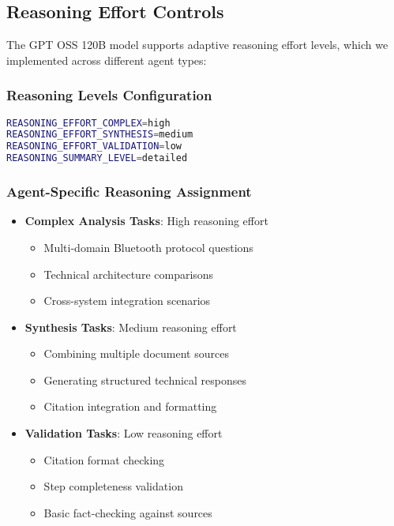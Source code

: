 \documentclass[12pt,a4paper]{article}
\begin{document}
\subsection{Reasoning Effort Controls}
The GPT OSS 120B model supports adaptive reasoning effort levels, which we implemented across different agent types:

\subsubsection{Reasoning Levels Configuration}
\begin{lstlisting}[language=bash, caption=Environment Variables for Reasoning Control]
REASONING_EFFORT_COMPLEX=high
REASONING_EFFORT_SYNTHESIS=medium  
REASONING_EFFORT_VALIDATION=low
REASONING_SUMMARY_LEVEL=detailed
\end{lstlisting}

\subsubsection{Agent-Specific Reasoning Assignment}
\begin{itemize}
    \item \textbf{Complex Analysis Tasks}: High reasoning effort
    \begin{itemize}
        \item Multi-domain Bluetooth protocol questions
        \item Technical architecture comparisons
        \item Cross-system integration scenarios
    \end{itemize}
    
    \item \textbf{Synthesis Tasks}: Medium reasoning effort
    \begin{itemize}
        \item Combining multiple document sources
        \item Generating structured technical responses
        \item Citation integration and formatting
    \end{itemize}
    
    \item \textbf{Validation Tasks}: Low reasoning effort
    \begin{itemize}
        \item Citation format checking
        \item Step completeness validation
        \item Basic fact-checking against sources
    \end{itemize}
\end{itemize}
\end{document}
